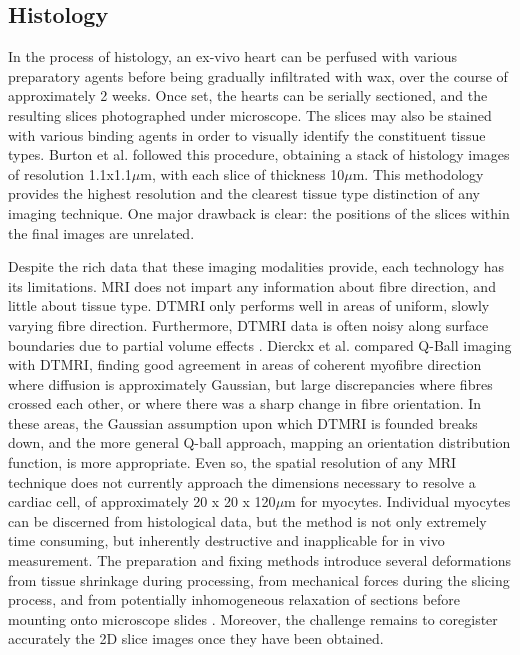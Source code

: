   \subsection{Histology} %
  \label{sub:histology}
  In the process of histology, an ex-vivo heart can be perfused with various preparatory agents before being gradually infiltrated with wax, over the course of approximately 2 weeks. Once set, the hearts can be serially sectioned, and the resulting slices photographed under microscope. The slices may also be stained with various binding agents in order to visually identify the constituent tissue types. Burton et al. \cite{Burton2006} followed this procedure, obtaining a stack of histology images of resolution 1.1x1.1$\mu$m, with each slice of thickness 10$\mu$m. This  methodology provides the highest resolution and the clearest tissue type distinction of any imaging technique. One major drawback is clear: the positions of the slices within the final images are unrelated.
  
  Despite the rich data that these imaging modalities provide, each technology has its limitations. MRI does not impart any information about fibre direction, and little about tissue type. DTMRI only performs well in areas of uniform, slowly varying fibre direction. Furthermore, DTMRI data is often noisy along surface boundaries due to partial volume effects \cite{Alexander2001}. Dierckx et al. \cite{Dierckx2009} compared Q-Ball imaging with DTMRI, finding good agreement in areas of coherent myofibre direction where diffusion is approximately Gaussian, but large discrepancies where fibres crossed each other, or where there was a sharp change in fibre orientation. In these areas, the Gaussian assumption upon which DTMRI is founded breaks down, and the more general Q-ball approach, mapping an orientation distribution function, is more appropriate. Even so, the spatial resolution of any MRI technique does not currently approach the dimensions necessary to resolve a cardiac cell, of approximately 20 x 20 x 120$\mu$m for myocytes. Individual myocytes can be discerned from histological data, but the method is not only extremely time consuming, but inherently destructive and inapplicable for in vivo measurement. The preparation and fixing methods introduce several deformations from tissue shrinkage during processing, from mechanical forces during the slicing process, and from potentially inhomogeneous relaxation of sections before mounting onto microscope slides \cite{Burton2006}. Moreover, the challenge remains to coregister accurately the 2D slice images once they have been obtained.

